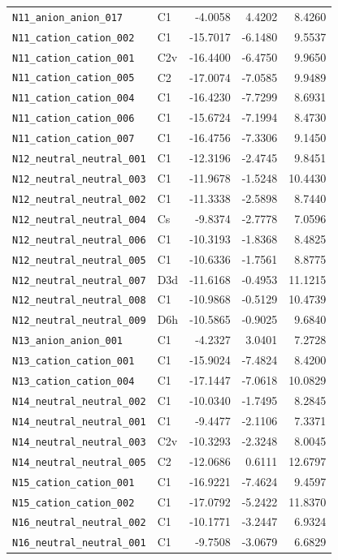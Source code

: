 {\begin{longtable}{@{}p{4.6cm}p{1.6cm}rrr@{}}
\texttt{N11\_anion\_anion\_017} & C1 & -4.0058 & 4.4202 & 8.4260 \\
\texttt{N11\_cation\_cation\_002} & C1 & -15.7017 & -6.1480 & 9.5537 \\
\texttt{N11\_cation\_cation\_001} & C2v & -16.4400 & -6.4750 & 9.9650 \\
\texttt{N11\_cation\_cation\_005} & C2 & -17.0074 & -7.0585 & 9.9489 \\
\texttt{N11\_cation\_cation\_004} & C1 & -16.4230 & -7.7299 & 8.6931 \\
\texttt{N11\_cation\_cation\_006} & C1 & -15.6724 & -7.1994 & 8.4730 \\
\texttt{N11\_cation\_cation\_007} & C1 & -16.4756 & -7.3306 & 9.1450 \\
\addlinespace
\texttt{N12\_neutral\_neutral\_001} & C1 & -12.3196 & -2.4745 & 9.8451 \\
\texttt{N12\_neutral\_neutral\_003} & C1 & -11.9678 & -1.5248 & 10.4430 \\
\texttt{N12\_neutral\_neutral\_002} & C1 & -11.3338 & -2.5898 & 8.7440 \\
\texttt{N12\_neutral\_neutral\_004} & Cs & -9.8374 & -2.7778 & 7.0596 \\
\texttt{N12\_neutral\_neutral\_006} & C1 & -10.3193 & -1.8368 & 8.4825 \\
\texttt{N12\_neutral\_neutral\_005} & C1 & -10.6336 & -1.7561 & 8.8775 \\
\texttt{N12\_neutral\_neutral\_007} & D3d & -11.6168 & -0.4953 & 11.1215 \\
\texttt{N12\_neutral\_neutral\_008} & C1 & -10.9868 & -0.5129 & 10.4739 \\
\texttt{N12\_neutral\_neutral\_009} & D6h & -10.5865 & -0.9025 & 9.6840 \\
\addlinespace
\texttt{N13\_anion\_anion\_001} & C1 & -4.2327 & 3.0401 & 7.2728 \\
\texttt{N13\_cation\_cation\_001} & C1 & -15.9024 & -7.4824 & 8.4200 \\
\texttt{N13\_cation\_cation\_004} & C1 & -17.1447 & -7.0618 & 10.0829 \\
\addlinespace
\texttt{N14\_neutral\_neutral\_002} & C1 & -10.0340 & -1.7495 & 8.2845 \\
\texttt{N14\_neutral\_neutral\_001} & C1 & -9.4477 & -2.1106 & 7.3371 \\
\texttt{N14\_neutral\_neutral\_003} & C2v & -10.3293 & -2.3248 & 8.0045 \\
\texttt{N14\_neutral\_neutral\_005} & C2 & -12.0686 & 0.6111 & 12.6797 \\
\addlinespace
\texttt{N15\_cation\_cation\_001} & C1 & -16.9221 & -7.4624 & 9.4597 \\
\texttt{N15\_cation\_cation\_002} & C1 & -17.0792 & -5.2422 & 11.8370 \\
\addlinespace
\texttt{N16\_neutral\_neutral\_002} & C1 & -10.1771 & -3.2447 & 6.9324 \\
\texttt{N16\_neutral\_neutral\_001} & C1 & -9.7508 & -3.0679 & 6.6829 \\
\end{longtable}
}